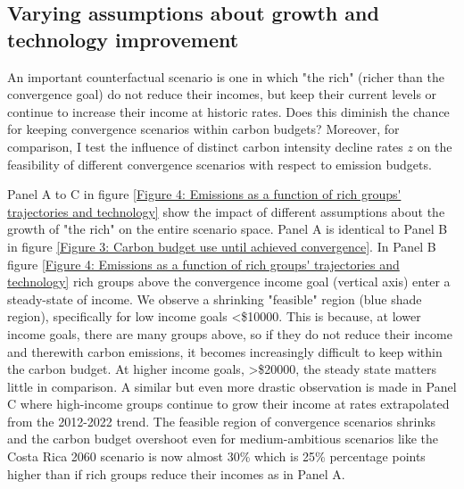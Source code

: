 \documentclass{article}
\begin{document}
\FloatBarrier


\subsection{Varying assumptions about growth and technology improvement}\label{Varying assumptions about growth and technology improvement}

An important counterfactual scenario is one in which "the rich" (richer than the convergence goal) do not reduce their incomes, but keep their current levels or continue to increase their income at historic rates. Does this diminish the chance for keeping convergence scenarios within carbon budgets? Moreover, for comparison, I test the influence of distinct carbon intensity decline rates \(z\) on the feasibility of different convergence scenarios with respect to emission budgets.

Panel A to C in figure \ref{Figure 4: Emissions as a function of rich groups' trajectories and technology} show the impact of different assumptions about the growth of "the rich" on the entire scenario space. Panel A is identical to Panel B in figure \ref{Figure 3: Carbon budget use until achieved convergence}. In Panel B figure \ref{Figure 4: Emissions as a function of rich groups' trajectories and technology} rich groups above the convergence income goal (vertical axis) enter a steady-state of income. We observe a shrinking "feasible" region (blue shade region), specifically for low income goals <\$10000. This is because, at lower income goals, there are many groups above, so if they do not reduce their income and therewith carbon emissions, it becomes increasingly difficult to keep within the carbon budget. At higher income goals, >\$20000, the steady state matters little in comparison. A similar but even more drastic observation is made in Panel C where high-income groups continue to grow their income at rates extrapolated from the 2012-2022 trend. The feasible region of convergence scenarios shrinks and the carbon budget overshoot even for medium-ambitious scenarios like the Costa Rica 2060 scenario is now almost 30\% which is 25\% percentage points higher than if rich groups reduce their incomes as in Panel A.
\end{document}
